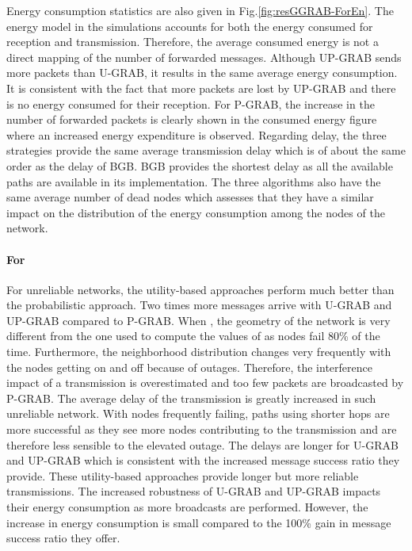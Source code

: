 \documentclass[journal, peerreview, onecolumn, draftcls]{IEEEtran}
\begin{document}
Energy consumption statistics are also given in Fig.\ref{fig:resGGRAB-ForEn}. The energy model in the simulations accounts for both the energy consumed for reception and transmission. Therefore, the average consumed energy is not a direct mapping of the number of forwarded messages. Although UP-GRAB sends more packets than U-GRAB, it results in the same average energy consumption. It is consistent with the fact that more packets are lost by UP-GRAB and there is no energy consumed for their reception. For P-GRAB, the increase in the number of forwarded packets is clearly shown in the consumed energy figure where an increased energy expenditure is observed.
Regarding delay, the three strategies provide the same average transmission delay which is of about the same order as the delay of BGB. BGB provides the shortest delay as all the available paths are available in its implementation.
The three algorithms also have the same average number of dead nodes which assesses that they have a similar impact on the distribution of the energy consumption among the nodes of the network.

\paragraph{\rm For }
For unreliable networks, the utility-based approaches perform much better than the probabilistic approach. Two times more messages arrive with U-GRAB and UP-GRAB compared to P-GRAB. When , the geometry of the network is very different from the one used to compute the values of  as nodes fail 80\% of the time. Furthermore, the neighborhood distribution changes very frequently with the nodes getting on and off because of outages. Therefore, the interference impact of a transmission is overestimated and too few packets are broadcasted by P-GRAB.
The average delay of the transmission is greatly increased in such unreliable network. With nodes frequently failing, paths using shorter hops are more successful as they see more nodes contributing to the transmission and are therefore less sensible to the elevated outage. The delays are longer for U-GRAB and UP-GRAB which is consistent with the increased message success ratio they provide. These utility-based approaches provide longer but more reliable transmissions.
The increased robustness of U-GRAB and UP-GRAB impacts their energy consumption as more broadcasts are performed. However, the increase in energy consumption is small compared to the 100\% gain in message success ratio they offer.
\end{document}
